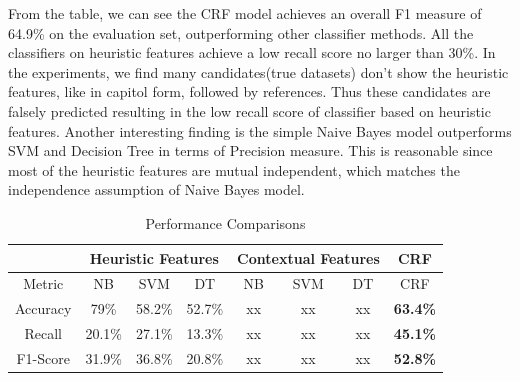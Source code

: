 \documentclass[10pt]{article}
\begin{document}
From the table, we can see the CRF model achieves an overall F1 measure of 64.9\% on the evaluation set, outperforming other classifier methods. All the classifiers on heuristic features achieve a low recall score no larger than 30\%. In the experiments, we find many candidates(true datasets) don't show the heuristic features, like in capitol form, followed by references. Thus these candidates are falsely predicted resulting in the low recall score of classifier based on heuristic features. Another interesting finding is the simple Naive Bayes model outperforms SVM and Decision Tree in terms of Precision measure. This is reasonable since most of the heuristic features are mutual independent, which matches the independence assumption of Naive Bayes model. 
\begin{table}
\centering
\hspace{-1cm}
\scriptsize
\vspace{0pt}
\begin{tabular}{|c @{\hskip 0.02in}| c c c @{\hskip 0.1in}| c c c @{\hskip 0.1in}| c |} %
	\hline %
	 & \multicolumn{3}{c|}{Heuristic Features} & \multicolumn{3}{c|}{Contextual Features} & \multicolumn{1}{c|}{CRF} \\
	\hline
	 Metric & NB & SVM & DT & NB & SVM & DT & CRF  \\ [0.2ex] %
	\hline \hline
	Accuracy & 79\% & 58.2\% & 52.7\% & xx & xx & xx & \textbf{63.4\%} \\
	\hline
	 Recall & 20.1\% & 27.1\% & 13.3\% & xx & xx & xx & \textbf{45.1\%} \\
	\hline
	F1-Score & 31.9\% & 36.8\% & 20.8\% & xx & xx & xx & \textbf{52.8\%} \\
	\hline %
	\end{tabular} 
	\caption{Performance Comparisons}
	\label{table:comparison} %
\end{table} 
\end{document}
